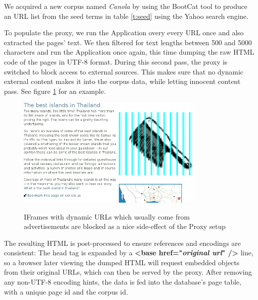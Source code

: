 We acquired a new corpus named \textit{Canola} by using the BootCat tool to produce an URL list from the seed terms in table \ref{t:seed} using the Yahoo search engine. 

To populate the proxy, we run the Application overy every URL once and also extracted the pages' text.
We then filtered for text lengths between 500 and 5000 characters and run the Application once again, this time dumping the raw HTML code of the pages in UTF-8 format.
During this second pass, the proxy is switched to block access to external sources.
This makes sure that no dynamic external content makes it into the corpus data, while letting innocent content pass.
See figure \ref{f:iframes} for an example.


\begin{figure}
	{\includegraphics[width=0.8\textwidth]{add}}
\caption{\label{f:iframes}IFrames with dynamic URLs which usually come from advertisements are blocked as a nice side-effect of the Proxy setup}
\end{figure}

The resulting HTML is post-processed to ensure references and encodings are consistent:
The head tag is expanded by a \textbf{<base href="\textit{original url}" />} line, so a browser later viewing the dumped HTML will request embedded objects from their original URLs, which can then be served by the proxy.
After removing any non-UTF-8 encoding hints, the data is fed into the database's page table, with a unique page id and the corpus id.


